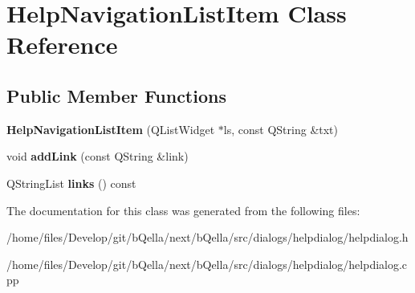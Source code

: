 \hypertarget{classHelpNavigationListItem}{
\section{HelpNavigationListItem Class Reference}
\label{classHelpNavigationListItem}
}
\subsection*{Public Member Functions}
\begin{DoxyCompactItemize}
\item 
\hypertarget{classHelpNavigationListItem_ab7eecdc4a796c9f0aaa4702003d91939}{
{\bfseries HelpNavigationListItem} (QListWidget $\ast$ls, const QString \&txt)}
\label{classHelpNavigationListItem_ab7eecdc4a796c9f0aaa4702003d91939}

\item 
\hypertarget{classHelpNavigationListItem_aa9f23d0e7b994a8f35354d7c86328663}{
void {\bfseries addLink} (const QString \&link)}
\label{classHelpNavigationListItem_aa9f23d0e7b994a8f35354d7c86328663}

\item 
\hypertarget{classHelpNavigationListItem_a0ba0efafe846d394d044d2e0b9f489cc}{
QStringList {\bfseries links} () const }
\label{classHelpNavigationListItem_a0ba0efafe846d394d044d2e0b9f489cc}

\end{DoxyCompactItemize}


The documentation for this class was generated from the following files:\begin{DoxyCompactItemize}
\item 
/home/files/Develop/git/bQella/next/bQella/src/dialogs/helpdialog/helpdialog.h\item 
/home/files/Develop/git/bQella/next/bQella/src/dialogs/helpdialog/helpdialog.cpp\end{DoxyCompactItemize}
